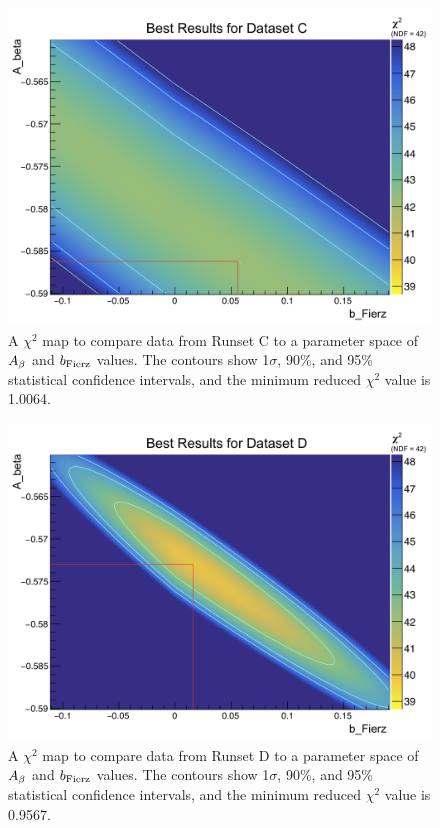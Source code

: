 \begin{figure}[h!tb]
	\centering
	\includegraphics[width=.999\linewidth]
	{Figures/Chi2_2D_SetC.png}
	\caption[$\chi^2$ Map for Runset C]{A $\chi^2$ map to compare data from Runset C to a parameter space of $A_{\beta}$ and $b_{\mathrm{Fierz}}$ values.  The contours show 1$\sigma$, 90\%, and 95\% statistical confidence intervals, and the minimum reduced $\chi^2$ value is 1.0064.  
	}	
	\label{fig:2dchi2_setC}
\end{figure}
%
\begin{figure}[h!tb]
	\centering
	\includegraphics[width=.999\linewidth]
	{Figures/Chi2_2D_SetD.png}
	\caption[$\chi^2$ Map for Runset D]{A $\chi^2$ map to compare data from Runset D to a parameter space of $A_{\beta}$ and $b_{\mathrm{Fierz}}$ values.  The contours show 1$\sigma$, 90\%, and 95\% statistical confidence intervals, and the minimum reduced $\chi^2$ value is 0.9567.  
	}	
	\label{fig:2dchi2_setD}
\end{figure}



